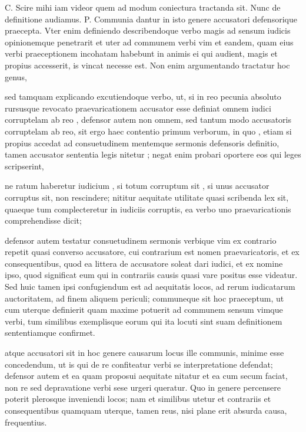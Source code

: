  C. Scire mihi iam videor quem ad modum coniectura tractanda sit. Nunc de definitione audiamus. P. Communia dantur in isto genere accusatori defensorique praecepta. Vter enim definiendo describendoque verbo magis ad sensum iudicis opinionemque penetrarit et uter ad communem verbi vim et eandem, quam eius verbi praeceptionem incohatam habebunt in animis ei qui audient, magis et propius accesserit, is vincat necesse est. Non enim argumentando tractatur hoc genus,

 sed tamquam explicando excutiendoque verbo, ut, si in reo pecunia absoluto rursusque revocato praevaricationem accusator esse definiat omnem iudici corruptelam ab reo , defensor autem non omnem, sed tantum modo accusatoris corruptelam ab reo, sit ergo haec contentio primum verborum, in quo , etiam si propius accedat ad consuetudinem mentemque sermonis defensoris definitio, tamen accusator sententia legis nitetur ; negat enim probari oportere eos qui leges scripserint,

 ne ratum haberetur iudicium , si totum corruptum sit , si unus accusator corruptus sit, non rescindere; nititur aequitate utilitate quasi scribenda lex sit, quaeque tum complecteretur in iudiciis corruptis, ea verbo uno praevaricationis comprehendisse dicit;

 defensor autem testatur consuetudinem sermonis verbique vim ex contrario repetit quasi converso accusatore, cui contrarium est nomen praevaricatoris, et ex consequentibus, quod ea littera de accusatore soleat dari iudici, et ex nomine ipso, quod significat eum qui in contrariis causis quasi vare positus esse videatur. Sed huic tamen ipsi confugiendum est ad aequitatis locos, ad rerum iudicatarum auctoritatem, ad finem aliquem periculi; communeque sit hoc praeceptum, ut cum uterque definierit quam maxime potuerit ad communem sensum vimque verbi, tum similibus exemplisque eorum qui ita locuti sint suam definitionem sententiamque confirmet.

 atque accusatori sit in hoc genere causarum locus ille communis, minime esse concedendum, ut is qui de re confiteatur verbi se interpretatione defendat; defensor autem et ea quam proposui aequitate nitatur et ea cum secum faciat, non re sed depravatione verbi sese urgeri queratur. Quo in genere percensere poterit plerosque inveniendi locos; nam et similibus utetur et contrariis et consequentibus quamquam uterque, tamen reus, nisi plane erit absurda causa, frequentius.

